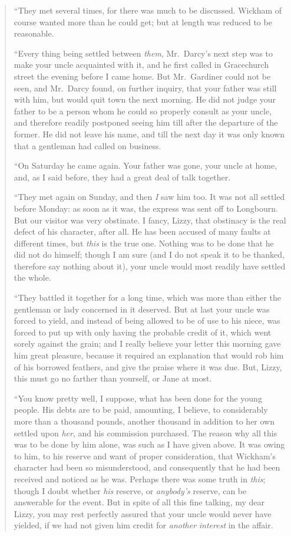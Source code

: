 \documentclass[12pt,english]{book}
\begin{document}
\begin{quotation}
{}``They met several times, for there was much to be discussed. Wickham
of course wanted more than he could get; but at length was reduced
to be reasonable.

{}``Every thing being settled between \textit{them}, Mr.\ Darcy's
next step was to make your uncle acquainted with it, and he first
called in Gracechurch street the evening before I came home. But Mr.\ Gardiner
could not be seen, and Mr.\ Darcy found, on further inquiry, that
your father was still with him, but would quit town the next morning.
He did not judge your father to be a person whom he could so properly
consult as your uncle, and therefore readily postponed seeing him
till after the departure of the former. He did not leave his name,
and till the next day it was only known that a gentleman had called
on business.

{}``On Saturday he came again. Your father was gone, your uncle at
home, and, as I said before, they had a great deal of talk together.

{}``They met again on Sunday, and then \textit{I} saw him too. It
was not all settled before Monday: as soon as it was, the express
was sent off to Longbourn. But our visitor was very obstinate. I fancy,
Lizzy, that obstinacy is the real defect of his character, after all.
He has been accused of many faults at different times, but \textit{this}
is the true one. Nothing was to be done that he did not do himself;
though I am sure (and I do not speak it to be thanked, therefore say
nothing about it), your uncle would most readily have settled the
whole.

{}``They battled it together for a long time, which was more than
either the gentleman or lady concerned in it deserved. But at last
your uncle was forced to yield, and instead of being allowed to be
of use to his niece, was forced to put up with only having the probable
credit of it, which went sorely against the grain; and I really believe
your letter this morning gave him great pleasure, because it required
an explanation that would rob him of his borrowed feathers, and give
the praise where it was due. But, Lizzy, this must go no farther than
yourself, or Jane at most.

{}``You know pretty well, I suppose, what has been done for the young
people. His debts are to be paid, amounting, I believe, to considerably
more than a thousand pounds, another thousand in addition to her own
settled upon \textit{her}, and his commission purchased. The reason
why all this was to be done by him alone, was such as I have given
above. It was owing to him, to his reserve and want of proper consideration,
that Wickham's character had been so misunderstood, and consequently
that he had been received and noticed as he was. Perhaps there was
some truth in \textit{this}; though I doubt whether \textit{his} reserve,
or \textit{anybody's} reserve, can be answerable for the event. But
in spite of all this fine talking, my dear Lizzy, you may rest perfectly
assured that your uncle would never have yielded, if we had not given
him credit for \textit{another} \textit{interest} in the affair.


\end{quotation}
\end{document}
